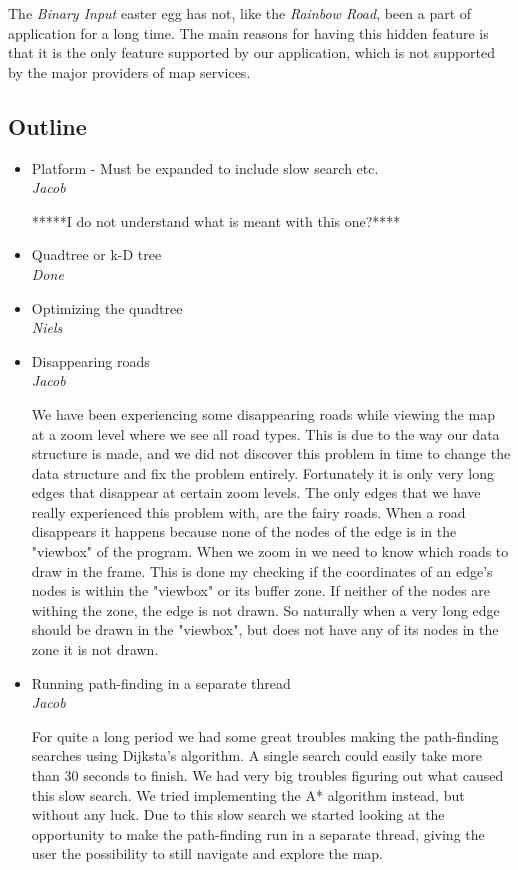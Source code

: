 \documentclass[a4paper,11pt]{article}
\begin{document}
The \textit{Binary Input} easter egg has not, like the \textit{Rainbow Road}, been a part of application for a long time. The main reasons for having this hidden feature is that it is the only feature supported by our application, which is not supported by the major providers of map services.

\subsection{Outline}
\begin{itemize}
	\item Platform - Must be expanded to include slow search etc. \\
		\textsl{Jacob}

                *****I do not understand what is meant with this one?****

                

	\item Quadtree or k-D tree \\
		\textsl{Done}
	\item Optimizing the quadtree \\
		\textsl{Niels}
	\item Disappearing roads \\
		\textsl{Jacob}

                We have been experiencing some disappearing roads while viewing the map at a zoom level where we see all road types. This is due to the way our data structure is made, and we did not discover this problem in time to change the data structure and fix the problem entirely. Fortunately it is only very long edges that disappear at certain zoom levels. The only edges that we have really experienced this problem with, are the fairy roads. When a road disappears it happens because none of the nodes of the edge is in the "viewbox" of the program. When we zoom in we need to know which roads to draw in the frame. This is done my checking if the coordinates of an edge's nodes is within the "viewbox" or its buffer zone. If neither of the nodes are withing the zone, the edge is not drawn. So naturally when a very long edge should be drawn in the "viewbox", but does not have any of its nodes in the zone it is not drawn. 

	\item Running path-finding in a separate thread \\
		\textsl{Jacob}
		
		For quite a long period we had some great troubles making the path-finding searches using Dijksta's algorithm. A single search could easily take more than 30 seconds to finish. We had very big troubles figuring out what caused this slow search. We tried implementing the A* algorithm instead, but without any luck. Due to this slow search we started looking at the opportunity to make the path-finding run in a separate thread, giving the user the possibility to still navigate and explore the map. 


\end{itemize}
\end{document}
